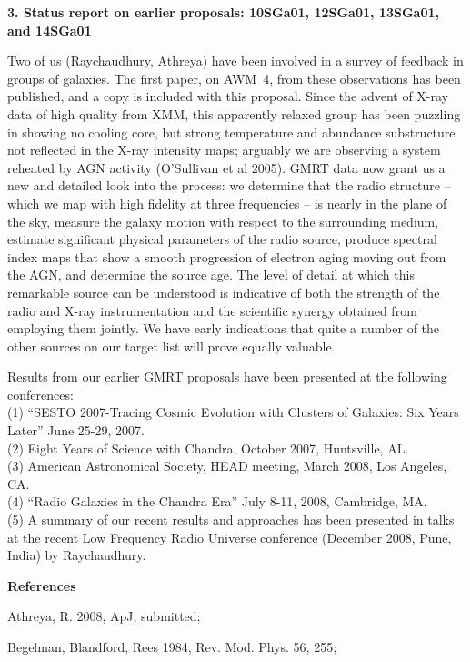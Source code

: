 \documentclass{article}
\begin{document}
\medskip
{\bf 3. Status report on earlier proposals: 10SGa01, 12SGa01, 13SGa01, and 14SGa01}

Two of us (Raychaudhury, Athreya) have been involved in a survey of
feedback in groups of galaxies.
The first paper, on AWM~4, from these observations has been published,
and a copy is included with this proposal.  
Since the advent of X-ray data of high quality from XMM,
this apparently relaxed group has been puzzling in showing no cooling core,
but strong temperature and abundance substructure not reflected in the
X-ray intensity maps; arguably we are observing a system reheated by
AGN activity (O'Sullivan et al 2005).  GMRT data now grant us
a new and detailed look into the process: we determine that the radio
structure -- which we map with high fidelity at three frequencies --
is nearly in the plane of the sky, measure the galaxy motion with respect
to the surrounding medium, estimate significant physical parameters of
the radio source, produce spectral index maps that show a smooth progression
of electron aging moving out from the AGN, and determine the source age.
The level of detail at which this remarkable source can be understood is
indicative of both the strength of the radio and X-ray instrumentation
and the scientific synergy obtained from employing them jointly.  
We have early indications that quite a number of the other sources on
our target list will prove equally valuable. 

Results from our earlier GMRT proposals have been presented at the
following conferences:\\
(1) ``SESTO 2007-Tracing Cosmic Evolution with Clusters of Galaxies: Six Years
Later'' June 25-29, 2007.\\
(2) Eight Years of Science with Chandra, October 2007, Huntsville, AL.\\
(3) American Astronomical Society, HEAD meeting, March 2008, Los
Angeles, CA.\\
(4) ``Radio Galaxies in the Chandra Era'' July 8-11, 2008, Cambridge, MA.\\ 
(5)  A summary of
our recent results and approaches has been presented in talks
at the recent Low Frequency Radio Universe conference (December 2008, Pune, India) by Raychaudhury.


\medskip
{\bf References}

\small

Athreya, R. 2008, ApJ, submitted;

Begelman, Blandford, Rees 1984, Rev. Mod. Phys. 56, 255;
\end{document}

